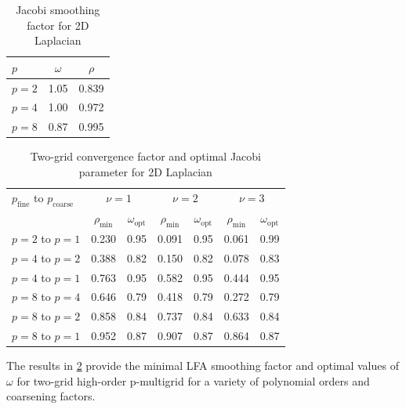 \documentclass[review]{siamart190516}
\begin{document}
\begin{table}[ht!]
\begin{center}
\begin{tabular}{l c c}
  \toprule
  $p$       &  $\omega$   &  $\rho$  \\
  \midrule
  $p = 2$   &  1.05       &  0.839   \\
  $p = 4$   &  1.00       &  0.972   \\
  $p = 8$   &  0.87       &  0.995   \\
  \bottomrule
\end{tabular}
\end{center}
\caption{Jacobi smoothing factor for 2D Laplacian}
\label{table:smoothing_factor_2d_jacobi}
\end{table}

\begin{table}[ht!]
\begin{center}
\begin{tabular}{l cc cc cc}
  \toprule
  $p_{\text{fine}}$ to $p_{\text{coarse}}$  &  \multicolumn{2}{c}{$\nu = 1$}  &  \multicolumn{2}{c}{$\nu = 2$}  &  \multicolumn{2}{c}{$\nu = 3$}  \\
                      &  $\rho_{\min}$  &  $\omega_{\text{opt}}$  &  $\rho_{\min}$ & $\omega_{\text{opt}}$  &  $\rho_{\min}$ & $\omega_{\text{opt}}$  \\
  \toprule
  $p = 2$ to $p = 1$  &  0.230 & 0.95  &  0.091 & 0.95  &  0.061 & 0.99   \\
  \midrule
  $p = 4$ to $p = 2$  &  0.388 & 0.82  &  0.150 & 0.82  &  0.078 & 0.83   \\
  $p = 4$ to $p = 1$  &  0.763 & 0.95  &  0.582 & 0.95  &  0.444 & 0.95   \\
  \midrule
  $p = 8$ to $p = 4$  &  0.646 & 0.79  &  0.418 & 0.79  &  0.272 & 0.79   \\
  $p = 8$ to $p = 2$  &  0.858 & 0.84  &  0.737 & 0.84  &  0.633 & 0.84   \\
  $p = 8$ to $p = 1$  &  0.952 & 0.87  &  0.907 & 0.87  &  0.864 & 0.87   \\
  \bottomrule
\end{tabular}
\end{center}
\caption{Two-grid convergence factor and optimal Jacobi parameter for 2D Laplacian}
\label{table:two_grid_2d}
\end{table}

The results in \cref{table:two_grid_2d} provide the minimal LFA smoothing factor and optimal values of $\omega$ for two-grid high-order p-multigrid for a variety of polynomial orders and coarsening factors.
\end{document}
